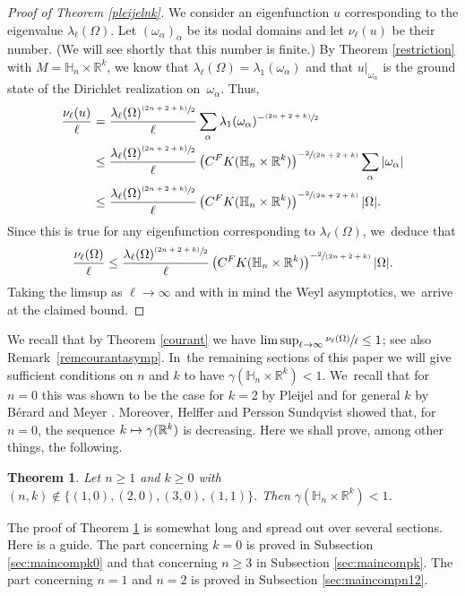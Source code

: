 \documentclass[11pt]{article}
\newcommand\mto{\mathchoice{\longmapsto}{\mapsto}{\mapsto}{\mapsto}}
\let\oldsfrac\sfrac
\renewcommand{\sfrac}[2]{{\oldsfrac{#1}{#2}}}
\newcommand{\psfrac}[2]{{\sfrac{(#1)}{#2}}}
\newcommand{\spfrac}[2]{{\sfrac{#1}{(#2)}}}
\newcommand{\FK}{\textup{FK}}
\newtheorem{theorem}{Theorem}[section]
\theoremstyle{definition}
\newcommand{\1}{\mathbbm{1}}
\newcommand{\R}{\mathbb{R}}
\numberwithin{equation}{section}
\begin{document}
\begin{proof}[Proof of Theorem \ref{pleijelnk}]
We consider an eigenfunction $u$ corresponding to the eigenvalue $\lambda_\ell(\Omega)$. Let $(\omega_\alpha)_\alpha$ be its nodal domains and let $\nu_\ell(u)$ be their number. (We will see shortly that this number is finite.) By Theorem \ref{restriction} with $M=\mathbb H_n\times\R^k$,
we know that $\lambda_\ell(\Omega) = \lambda_1(\omega_\alpha)$ and that $u|_{\omega_\alpha}$ is the ground state of the Dirichlet realization on~$\omega_\alpha$. Thus,
\begin{align*}
\frac{\nu_\ell(u)}{\ell} & = \frac{\lambda_\ell(\Omega)^{\psfrac{2n+2+k}{2}}}{\ell} \sum_\alpha \lambda_1(\omega_\alpha)^{-\psfrac{2n+2+k}{2}} \\
& \leq \frac{\lambda_\ell(\Omega)^{\psfrac{2n+2+k}{2}}}{\ell} \left(C^\FK(\mathbb H_n\times\R^k)\right)^{-\spfrac{2}{2n+2+k}} \sum_\alpha |\omega_\alpha| \\
& \leq \frac{\lambda_\ell(\Omega)^{\psfrac{2n+2+k}{2}}}{\ell} \left(C^\FK(\mathbb H_n\times\R^k)\right)^{-\spfrac{2}{2n+2+k}} |\Omega|.
\end{align*}
Since this is true for any eigenfunction corresponding to $\lambda_\ell(\Omega)$, we~deduce that
\[
\frac{\nu_\ell(\Omega)}{\ell} \leq \frac{\lambda_\ell(\Omega)^{\psfrac{2n+2+k}{2}}}{\ell} \left(C^\FK(\mathbb H_n\times\R^k)\right)^{-\spfrac{2}{2n+2+k}} |\Omega|.
\]
Taking the limsup as $\ell\to\infty$ and with in mind the Weyl asymptotics, we~arrive at the claimed bound.
\end{proof}

We recall that by Theorem \ref{courant} we have $\limsup_{\ell\to\infty} \sfrac{\nu_\ell(\Omega)}{\ell} \leq 1$; see also Remark~\ref{remcourantasymp}. In~the remaining sections of this paper we will give sufficient conditions on $n$ and $k$ to have $\gamma(\mathbb H_n\times\R^k)<1$. We~recall that for $n=0$ this was shown to be the case for $k=2$ by Pleijel \cite{Pl} and for general $k$ by Bérard and Meyer \cite{BerMe}. Moreover, Helffer and Persson Sundqvist \cite{HPS} showed that, for $n=0$, the sequence $k\mto\gamma(\R^k)$ is decreasing. Here we shall prove, among other things, the following.

\begin{theorem}\label{maincomp}
Let $n\geq 1$ and $k\geq 0$ with $(n,k)\not\in\{(1,0),(2,0),(3,0),(1,1)\}$. Then $\gamma(\mathbb H_n\times\R^k)<1$.
\end{theorem}

The proof of Theorem \ref{maincomp} is somewhat long and spread out over several sections. Here is a guide. The part concerning $k=0$ is proved in Subsection \ref{sec:maincompk0} and that concerning $n\geq 3$ in Subsection \ref{sec:maincompk}. The part concerning $n=1$ and $n=2$ is proved in Subsection \ref{sec:maincompn12}.
\end{document}
